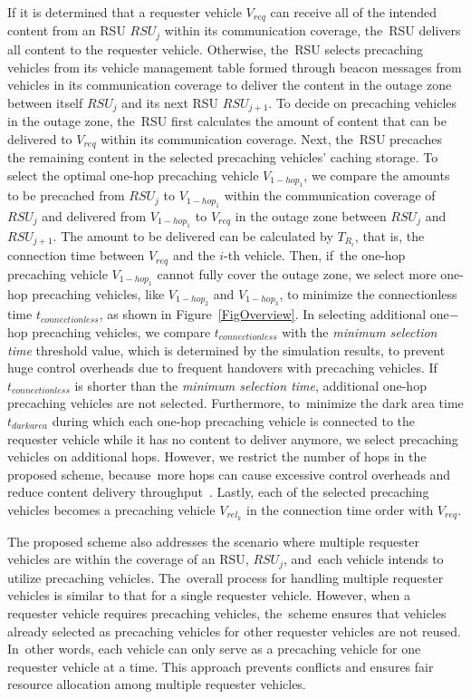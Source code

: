 \documentclass[electronics,aricle,accept,pdftex,moreauthors]{Definitions/mdpi}
\begin{document}
If it is determined that a requester vehicle $V_{req}$ can receive all of the intended content from an RSU $RSU_{j}$ within its communication coverage, the~RSU delivers all content to the requester vehicle.
Otherwise, the~RSU selects precaching vehicles from its vehicle management table formed through beacon messages from vehicles in its communication coverage to deliver the content in the outage zone between itself $RSU_{j}$ and its next RSU $RSU_{j+1}$.
To decide on precaching vehicles in the outage zone, the~RSU first calculates the amount of content that can be delivered to $V_{req}$ within its communication coverage.
Next, the~RSU precaches the remaining content in the selected precaching vehicles' caching storage.
To select the optimal one-hop precaching vehicle $V_{1-hop_{1}}$, we compare the amounts to be precached from $RSU_{j}$ to $V_{1-hop_{1}}$ within the communication coverage of $RSU_{j}$ and delivered from $V_{1-hop_{1}}$ to $V_{req}$ in the outage zone between $RSU_{j}$ and $RSU_{j+1}$.
The amount to be delivered can be calculated by $T_{R_{i}}$, that is, the connection time between $V_{req}$ and the $i$-th vehicle.
Then, if~the one-hop precaching vehicle $V_{1-hop_{1}}$ cannot fully cover the outage zone, we select more one-hop precaching vehicles, like $V_{1-hop_{2}}$ and $V_{1-hop_{3}}$, to minimize the connectionless time $t_{connectionless}$, as shown in Figure~\ref{FigOverview}.
In selecting additional one$-$hop precaching vehicles, we compare $t_{connectionless}$ with the \textit{minimum selection time} threshold value, which is determined by the simulation results, to prevent huge control overheads due to frequent handovers with precaching vehicles.
If $t_{connectionless}$ is shorter than the \textit{minimum selection time}, additional one-hop precaching vehicles are not selected.
Furthermore, to~minimize the dark area time $t_{darkarea}$ during which each one-hop precaching vehicle is connected to the requester vehicle while it has no content to deliver anymore, we select precaching vehicles on additional hops.
However, we restrict the number of hops in the proposed scheme, because~more hops can cause excessive control overheads and reduce content delivery throughput~\cite{Gupta2000}.
Lastly, each of the selected precaching vehicles becomes a precaching vehicle $V_{rel_{k}}$ in the connection time order with $V_{req}$.

The proposed scheme also addresses the scenario where multiple requester vehicles are within the coverage of an RSU, $RSU_{j}$, and~each vehicle intends to utilize precaching vehicles. The~overall process for handling multiple requester vehicles is similar to that for a single requester vehicle. However, when a requester vehicle requires precaching vehicles, the~scheme ensures that vehicles already selected as precaching vehicles for other requester vehicles are not reused. In~other words, each vehicle can only serve as a precaching vehicle for one requester vehicle at a time. This approach prevents conflicts and ensures fair resource allocation among multiple requester vehicles.
\end{document}
